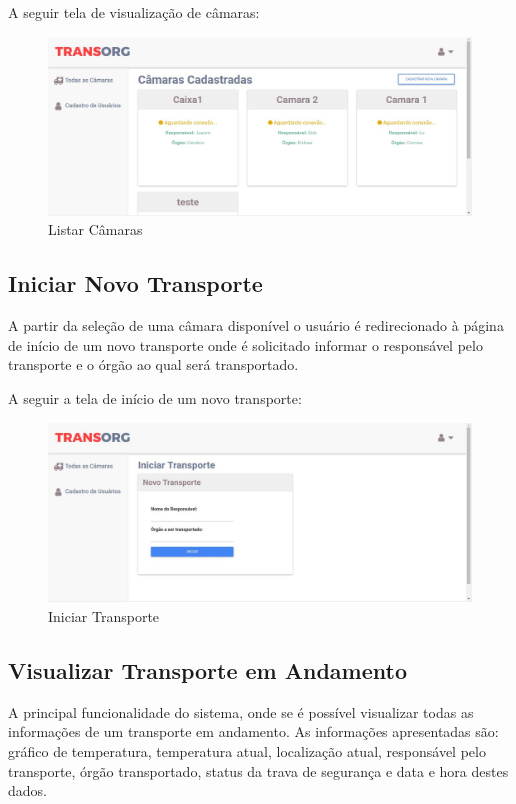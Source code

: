 	A seguir tela de visualização de câmaras:

\begin{figure}[H]
\centering
\includegraphics[width=16cm]{figuras/listaCamaras_software.JPG}
\caption{Listar Câmaras}
\end{figure}

\subsection{Iniciar Novo Transporte}
	A partir da seleção de uma câmara disponível o usuário é redirecionado à página de início de um novo transporte onde é solicitado informar o responsável pelo transporte e o órgão ao qual será transportado.
	
	A seguir a tela de início de um novo transporte:

\begin{figure}[H]
\centering
\includegraphics[width=16cm]{figuras/iniciarTransporte_software.JPG}
\caption{Iniciar Transporte}
\end{figure}

\subsection{Visualizar Transporte em Andamento}
	A principal funcionalidade do sistema, onde se é possível visualizar todas as informações de um transporte em andamento. As informações apresentadas são: gráfico de temperatura, temperatura atual, localização atual, responsável pelo transporte, órgão transportado, status da trava de segurança e data e hora destes dados.


